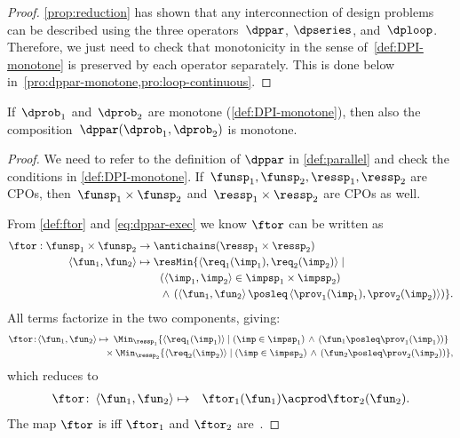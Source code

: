 \begin{proof}
    \cref{prop:reduction} has shown that any interconnection of design
    problems can be described using the three operators~$\dppar$, $\dpseries$,
    and~$\dploop$. Therefore, we just need to check that monotonicity
    in the sense of~\cref{def:DPI-monotone} is preserved by each operator
    separately. This is done below in~\cref{pro:dppar-monotone,pro:loop-continuous}.
\end{proof}

\begin{proposition}
    \label{pro:dppar-monotone}If~$\dprob_{1}$ and~$\dprob_{2}$ are
    monotone (\cref{def:DPI-monotone}), then also the composition~$\dppar(\dprob_{1},\dprob_{2})$
    is monotone.
\end{proposition}
\begin{proof}
    We need to refer to the definition of $\dppar$ in \cref{def:parallel}
    and check the conditions in \cref{def:DPI-monotone}. If~$\funsp_{1},\funsp_{2},\ressp_{1},\ressp_{2}$
    are CPOs, then~$\funsp_{1}\times\funsp_{2}$ and~$\ressp_{1}\times\ressp_{2}$
    are CPOs as well.

    From \cref{def:ftor} and \cref{eq:dppar-exec} we know $\ftor$ can
    be written as
    \begin{align*}
        \ftor:\funsp_{1}\times\funsp_{2} & \rightarrow\antichains(\ressp_{1}\times\ressp_{2})\\
        \left\langle \fun_{1},\fun_{2}\right\rangle  & \mapsto\resMin\{\left\langle \req_{1}(\imp_{1}),\req_{2}(\imp_{2})\right\rangle \mid\\
        & \qquad\left(\left\langle \imp_{1},\imp_{2}\right\rangle \in\impsp_{1}\times\impsp_{2}\right)\\
        & \qquad\,\wedge\,\left(\left\langle \fun_{1},\fun_{2}\right\rangle \posleq\left\langle \prov_{1}(\imp_{1}),\prov_{2}(\imp_{2})\right\rangle \right)\}.
    \end{align*}
    All terms factorize in the two components, giving:{\small{}
        \begin{align*}
            \ftor\!:\!\left\langle \fun_{1},\fun_{2}\right\rangle \mapsto & \!\!\!\quad\Min_{\ressp_{1}}\{\left\langle \req_{1}(\imp_{1})\right\rangle \mid\left(\imp\in\impsp_{1}\right)\,\wedge\,\left(\fun_{1}\posleq\prov_{1}(\imp_{1})\right)\}\\
            & \!\!\!\times\Min_{\ressp_{2}}\{\left\langle \req_{2}(\imp_{2})\right\rangle \mid\left(\imp\in\impsp_{2}\right)\,\wedge\,\left(\fun_{2}\posleq\prov_{2}(\imp_{2})\right)\},
        \end{align*}
    }which reduces to
    \begin{eqnarray}
        \ftor\colon\left\langle \fun_{1},\fun_{2}\right\rangle  & \mapsto & \ftor_{1}(\fun_{1})\acprod\ftor_{2}(\fun_{2}).\label{eq:isproduct}
    \end{eqnarray}
    The map $\ftor$ is \scottcontinuous iff $\ftor_{1}$ and $\ftor_{2}$
    are~\cite[Lemma II.2.8]{gierz03continuous}.
\end{proof}

